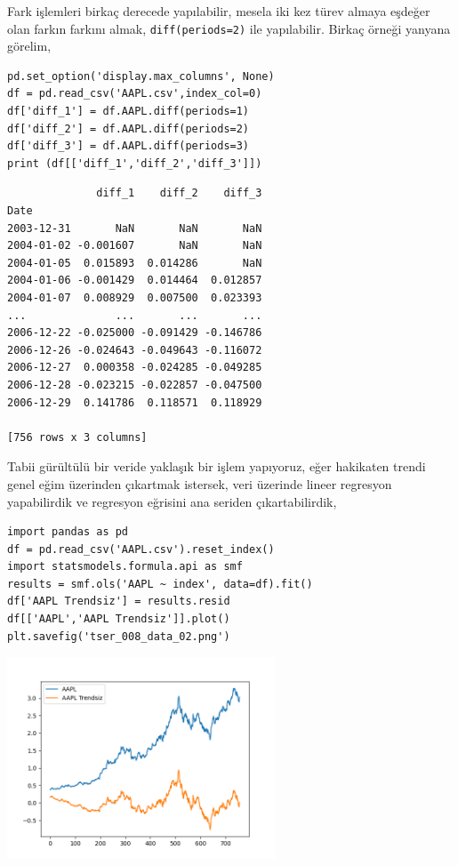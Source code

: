 \documentclass[12pt,fleqn]{article}\usepackage{../../common}
\begin{document}
Fark işlemleri birkaç derecede yapılabilir, mesela iki kez türev almaya
eşdeğer olan farkın farkını almak, \verb!diff(periods=2)! ile yapılabilir.
Birkaç örneği yanyana görelim,

\begin{verbatim}
pd.set_option('display.max_columns', None)
df = pd.read_csv('AAPL.csv',index_col=0)
df['diff_1'] = df.AAPL.diff(periods=1)
df['diff_2'] = df.AAPL.diff(periods=2)
df['diff_3'] = df.AAPL.diff(periods=3)
print (df[['diff_1','diff_2','diff_3']])
\end{verbatim}

\begin{verbatim}
              diff_1    diff_2    diff_3
Date                                    
2003-12-31       NaN       NaN       NaN
2004-01-02 -0.001607       NaN       NaN
2004-01-05  0.015893  0.014286       NaN
2004-01-06 -0.001429  0.014464  0.012857
2004-01-07  0.008929  0.007500  0.023393
...              ...       ...       ...
2006-12-22 -0.025000 -0.091429 -0.146786
2006-12-26 -0.024643 -0.049643 -0.116072
2006-12-27  0.000358 -0.024285 -0.049285
2006-12-28 -0.023215 -0.022857 -0.047500
2006-12-29  0.141786  0.118571  0.118929

[756 rows x 3 columns]
\end{verbatim}

Tabii gürültülü bir veride yaklaşık bir işlem yapıyoruz, eğer hakikaten trendi
genel eğim üzerinden çıkartmak istersek, veri üzerinde lineer regresyon
yapabilirdik ve regresyon eğrisini ana seriden çıkartabilirdik,

\begin{verbatim}
import pandas as pd
df = pd.read_csv('AAPL.csv').reset_index()
import statsmodels.formula.api as smf
results = smf.ols('AAPL ~ index', data=df).fit()
df['AAPL Trendsiz'] = results.resid
df[['AAPL','AAPL Trendsiz']].plot()
plt.savefig('tser_008_data_02.png')
\end{verbatim}

\includegraphics[height=6cm]{tser_008_data_02.png}
\end{document}
